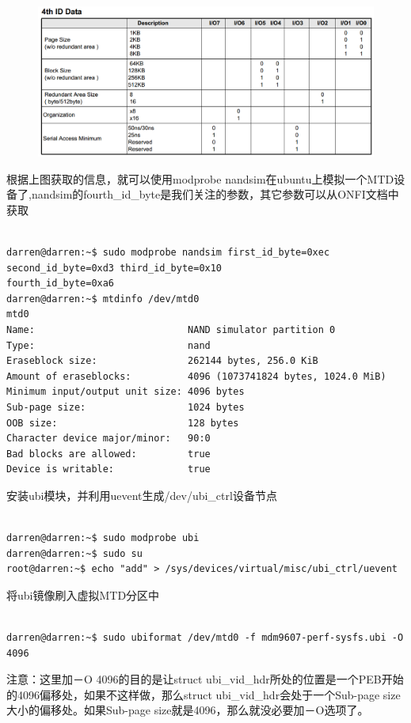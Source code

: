 \begin{figure}[htbp]
\centering
\includegraphics[keepaspectratio,width=\textwidth,height=0.75\textheight]{img/20170517170203.png}
\end{figure}
根据上图获取的信息，就可以使用modprobe nandsim在ubuntu上模拟一个MTD设备了,nandsim的fourth\_id\_byte是我们关注的参数，其它参数可以从ONFI文档中获取
\begin{mdframed}[backgroundcolor=ubuntured,fontcolor=white,hidealllines=true]
\begin{verbatim}

darren@darren:~$ sudo modprobe nandsim first_id_byte=0xec second_id_byte=0xd3 third_id_byte=0x10 
fourth_id_byte=0xa6
darren@darren:~$ mtdinfo /dev/mtd0
mtd0
Name:                           NAND simulator partition 0
Type:                           nand
Eraseblock size:                262144 bytes, 256.0 KiB
Amount of eraseblocks:          4096 (1073741824 bytes, 1024.0 MiB)
Minimum input/output unit size: 4096 bytes
Sub-page size:                  1024 bytes
OOB size:                       128 bytes
Character device major/minor:   90:0
Bad blocks are allowed:         true
Device is writable:             true

\end{verbatim}
\end{mdframed}
安装ubi模块，并利用uevent生成/dev/ubi\_ctrl设备节点
\begin{mdframed}[backgroundcolor=ubuntured,fontcolor=white,hidealllines=true]
\begin{verbatim}

darren@darren:~$ sudo modprobe ubi
darren@darren:~$ sudo su
root@darren:~$ echo "add" > /sys/devices/virtual/misc/ubi_ctrl/uevent

\end{verbatim}
\end{mdframed}
将ubi镜像刷入虚拟MTD分区中
\begin{mdframed}[backgroundcolor=ubuntured,fontcolor=white,hidealllines=true]
\begin{verbatim}

darren@darren:~$ sudo ubiformat /dev/mtd0 -f mdm9607-perf-sysfs.ubi -O 4096

\end{verbatim}
\end{mdframed}
注意：这里加－O 4096的目的是让struct ubi\_vid\_hdr所处的位置是一个PEB开始的4096偏移处，如果不这样做，那么struct ubi\_vid\_hdr会处于一个Sub-page size大小的偏移处。如果Sub-page size就是4096，那么就没必要加－O选项了。
\vspace{12 pt}

